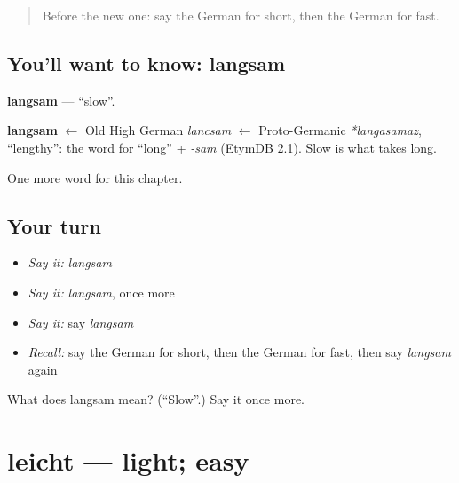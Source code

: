 \label{lesson:GE-C89-langsam}



\begin{quote}
Before the new one: say the German for short, then the German for fast.
\end{quote}

\subsection*{You'll want to know: langsam}
\textbf{langsam} — \textquotedblleft{}slow\textquotedblright{}.

\begin{cousinweb}
\textbf{langsam} $\leftarrow$ Old High German \emph{lancsam} $\leftarrow$ Proto-Germanic \emph{*langasamaz}, \textquotedblleft{}lengthy\textquotedblright{}: the word for \textquotedblleft{}long\textquotedblright{} + \emph{-sam} (EtymDB 2.1). Slow is what takes long.
\end{cousinweb}

\begin{grammarlens}[title={What you've built}]
One more word for this chapter.
\end{grammarlens}

\subsection*{Your turn}
\begin{itemize}
\raggedright
  \item \emph{Say it:} \emph{langsam}
  \item \emph{Say it:} \emph{langsam}, once more
  \item \emph{Say it:} say \emph{langsam}
  \item \emph{Recall:} say the German for short, then the German for fast, then say \emph{langsam} again
\end{itemize}

\begin{tcolorbox}[breakable,colback=teal!4,colframe=teal!35!black,title={Before you move on}]
What does langsam mean? (\textquotedblleft{}Slow\textquotedblright{}.) Say it once more.
\end{tcolorbox}
\section[leicht]{leicht — light; easy}

\label{lesson:GE-C89-leicht}



